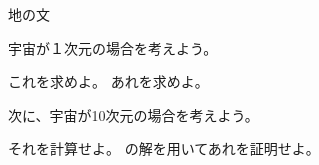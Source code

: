 \documentclass[a4paper,12pt]{jsarticle}
\begin{document}
\maketitle

地の文~\cite{qm_sunagawa}
\begin{qparts}
    \qpart 宇宙が１次元の場合を考えよう。
        \begin{qlist}
            \qitem これを求めよ。
            \qitem あれを求めよ。
        \end{qlist}
    \qpart 次に、宇宙が10次元の場合を考えよう。
        \begin{qlist}
            \qitem それを計算せよ。\label{q:10dim}
            \qitem {}の解を用いてあれを証明せよ。
        \end{qlist}
\end{qparts}



\end{document}
